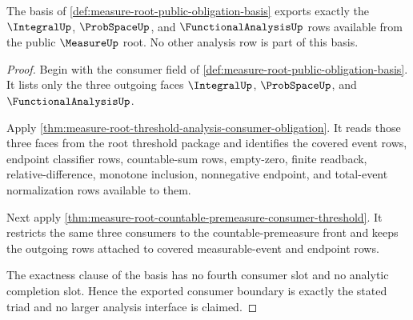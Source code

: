 \begin{theorem}
\label{thm:measure-root-public-obligation-basis-consumer}
The basis of \autoref{def:measure-root-public-obligation-basis} exports
exactly the $\IntegralUp$, $\ProbSpaceUp$, and $\FunctionalAnalysisUp$ rows
available from the public $\MeasureUp$ root. No other analysis row is part of
this basis.
\end{theorem}
\begin{proof}
Begin with the consumer field of
\autoref{def:measure-root-public-obligation-basis}. It lists only the three
outgoing faces $\IntegralUp$, $\ProbSpaceUp$, and $\FunctionalAnalysisUp$.

Apply \autoref{thm:measure-root-threshold-analysis-consumer-obligation}. It
reads those three faces from the root threshold package and identifies the
covered event rows, endpoint classifier rows, countable-sum rows,
empty-zero, finite readback, relative-difference, monotone inclusion,
nonnegative endpoint, and total-event normalization rows available to them.

Next apply \autoref{thm:measure-root-countable-premeasure-consumer-threshold}.
It restricts the same three consumers to the countable-premeasure front and
keeps the outgoing rows attached to covered measurable-event and endpoint
rows.

The exactness clause of the basis has no fourth consumer slot and no
analytic completion slot. Hence the exported consumer boundary is exactly
the stated triad and no larger analysis interface is claimed.
\end{proof}

